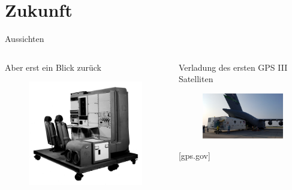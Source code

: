 \section{Zukunft}

\begin{frame}{Aussichten}
    \begin{columns}
        \begin{column}{0.5\textwidth}
            Aber erst ein Blick zurück
            \begin{figure}
                \centering
                \includegraphics[width=\textwidth]{images/erster_empfaenger.jpg}
            \end{figure}
            \centering{\small [TimeAndNavigation]}
        \end{column}\pause
        \begin{column}{0.5\textwidth}
            Verladung des ersten GPS III Satelliten
            \begin{figure}
                \centering
                \includegraphics[width=\textwidth]{images/gps3-satellit-verladung.JPG}
            \end{figure}
            {\small [gps.gov]}
        \end{column}
    \end{columns}
\end{frame}

